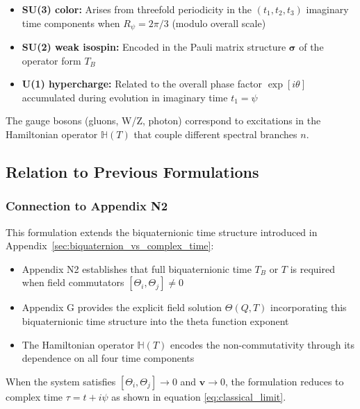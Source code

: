 \begin{itemize}
\item \textbf{SU(3) color:} Arises from threefold periodicity in the $(t_1, t_2, t_3)$ imaginary time components when $R_\psi = 2\pi/3$ (modulo overall scale)

\item \textbf{SU(2) weak isospin:} Encoded in the Pauli matrix structure $\boldsymbol{\sigma}$ of the operator form $T_B$

\item \textbf{U(1) hypercharge:} Related to the overall phase factor $\exp[i\theta]$ accumulated during evolution in imaginary time $t_1 = \psi$
\end{itemize}

The gauge bosons (gluons, W/Z, photon) correspond to excitations in the Hamiltonian operator $\mathbb{H}(T)$ that couple different spectral branches $n$.

\subsection{Relation to Previous Formulations}

\subsubsection{Connection to Appendix N2}

This formulation extends the biquaternionic time structure introduced in Appendix~\ref{sec:biquaternion_vs_complex_time}:

\begin{itemize}
\item Appendix N2 establishes that full biquaternionic time $T_B$ or $T$ is required when field commutators $[\Theta_i, \Theta_j] \neq 0$

\item Appendix G provides the explicit field solution $\Theta(Q,T)$ incorporating this biquaternionic time structure into the theta function exponent

\item The Hamiltonian operator $\mathbb{H}(T)$ encodes the non-commutativity through its dependence on all four time components
\end{itemize}

When the system satisfies $[\Theta_i, \Theta_j] \to 0$ and $\mathbf{v} \to 0$, the formulation reduces to complex time $\tau = t + i\psi$ as shown in equation \eqref{eq:classical_limit}.

